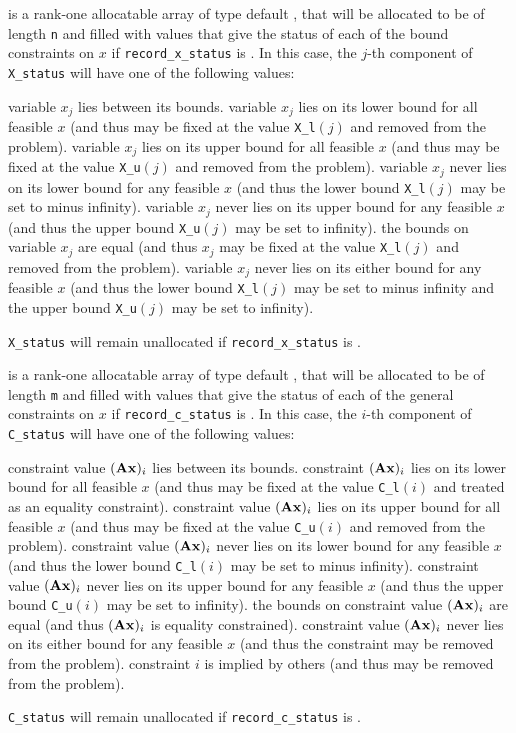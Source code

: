 \documentclass{galahad}
\begin{document}
\begin{description}
 is a rank-one allocatable array of type default \integer,
that will be allocated to be of length {\tt n} and filled with values
that give the status of each of the bound constraints on $x$ if 
{\tt record\_x\_status} is \true. In this case, the $j$-th component of 
{\tt X\_status} will have one of the following values:
\begin{description}
 variable $x_j$ lies between its bounds.
 variable $x_j$ lies on its lower bound for all feasible $x$ (and thus 
may be fixed at the value {\tt X\_l}$(j)$ and removed from the problem).
 variable $x_j$ lies on its upper bound for all feasible $x$ 
(and thus 
may be fixed at the value {\tt X\_u}$(j)$ and removed from the problem).
 variable $x_j$ never lies on its lower bound for any feasible $x$ 
(and thus the lower bound {\tt X\_l}$(j)$ may be set to minus infinity).
 variable $x_j$ never lies on its upper bound for any feasible $x$ 
(and thus the upper bound {\tt X\_u}$(j)$ may be set to infinity).
 the bounds on variable $x_j$ are equal
(and thus $x_j$
may be fixed at the value {\tt X\_l}$(j)$ and removed from the problem).
 variable $x_j$ never lies on its either bound for any feasible $x$ 
(and thus the lower bound {\tt X\_l}$(j)$ may be set to minus infinity
and the upper bound {\tt X\_u}$(j)$ may be set to infinity).
\end{description}
{\tt X\_status} will remain unallocated if
{\tt record\_x\_status} is \false.

 is a rank-one allocatable array of  
type default \integer, that will be allocated to be of length {\tt m}
and filled with values that give the status of each of the general constraints
on $x$ if {\tt record\_c\_status} is \true. In this case, the $i$-th
component of {\tt C\_status} will have one of the following values:
\begin{description}
 constraint value $({\mathbf{A}} {\mathbf{x}})_i$ lies between its bounds.
 constraint $({\mathbf{A}} {\mathbf{x}})_i$ lies on its lower bound for all feasible 
$x$ (and thus 
may be fixed at the value {\tt C\_l}$(i)$ and treated as an equality constraint).
 constraint value $({\mathbf{A}} {\mathbf{x}})_i$ lies on its upper bound for all 
feasible $x$ (and thus may be fixed at the value 
{\tt C\_u}$(i)$ and removed from the problem).
 constraint value $({\mathbf{A}} {\mathbf{x}})_i$ never lies on its lower bound for 
any feasible $x$ 
(and thus the lower bound {\tt C\_l}$(i)$ may be set to minus infinity).
 constraint value $({\mathbf{A}} {\mathbf{x}})_i$  never lies on its upper 
bound for any feasible $x$ 
(and thus the upper bound {\tt C\_u}$(i)$ may be set to infinity).
 the bounds on constraint value $({\mathbf{A}} {\mathbf{x}})_i$ are equal
(and thus $({\mathbf{A}} {\mathbf{x}})_i$ is equality constrained).
 constraint value $({\mathbf{A}} {\mathbf{x}})_i$ never lies on its either bound for any 
feasible $x$ (and thus the constraint may be removed from the problem).
 constraint $i$ is implied by others 
(and thus may be removed from the problem).
\end{description}
{\tt C\_status} will remain unallocated if
{\tt record\_c\_status} is \false.


\end{description}
\end{document}
